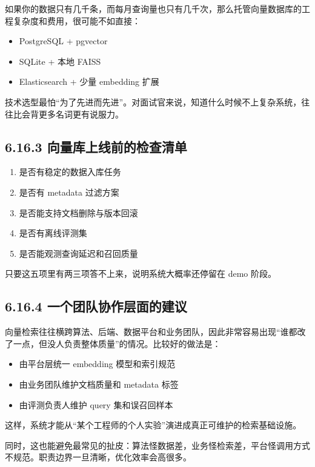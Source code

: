 如果你的数据只有几千条，而每月查询量也只有几千次，那么托管向量数据库的工程复杂度和费用，很可能不如直接：


\begin{itemize}[leftmargin=2em]
\item PostgreSQL + pgvector
\item SQLite + 本地 FAISS
\item Elasticsearch + 少量 embedding 扩展
\end{itemize}

技术选型最怕``为了先进而先进''。对面试官来说，知道什么时候不上复杂系统，往往比会背更多名词更有说服力。


\subsection{6.16.3 向量库上线前的检查清单}

\begin{enumerate}[leftmargin=2em]
\item 是否有稳定的数据入库任务
\item 是否有 metadata 过滤方案
\item 是否能支持文档删除与版本回滚
\item 是否有离线评测集
\item 是否能观测查询延迟和召回质量
\end{enumerate}

只要这五项里有两三项答不上来，说明系统大概率还停留在 demo 阶段。


\subsection{6.16.4 一个团队协作层面的建议}

向量检索往往横跨算法、后端、数据平台和业务团队，因此非常容易出现``谁都改了一点，但没人负责整体质量''的情况。比较好的做法是：


\begin{itemize}[leftmargin=2em]
\item 由平台层统一 embedding 模型和索引规范
\item 由业务团队维护文档质量和 metadata 标签
\item 由评测负责人维护 query 集和误召回样本
\end{itemize}

这样，系统才能从``某个工程师的个人实验''演进成真正可维护的检索基础设施。

同时，这也能避免最常见的扯皮：算法怪数据差，业务怪检索差，平台怪调用方式不规范。职责边界一旦清晰，优化效率会高很多。

